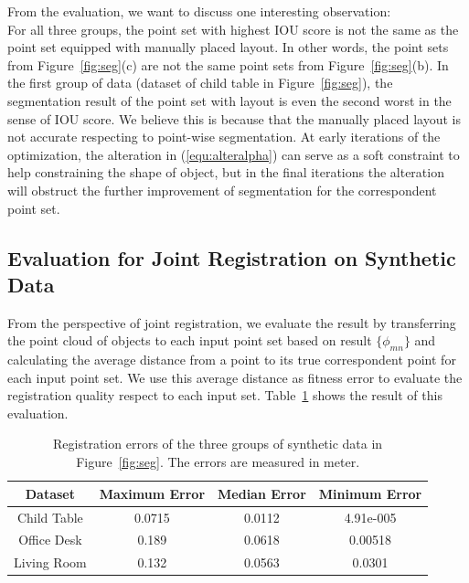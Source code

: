 From the evaluation, we want to discuss one interesting observation:\\
%
For all three groups, the point set with highest IOU score is not the same as the point set equipped with manually placed layout.
In other words, the point sets from Figure~\ref{fig:seg}(c) are not the same point sets from Figure~\ref{fig:seg}(b). 
In the first group of data (dataset of child table in Figure~\ref{fig:seg}), the segmentation result of the point set with layout is even the second worst in the sense of IOU score. We believe this is because that the manually placed layout is not accurate respecting to point-wise segmentation. 
At early iterations of the optimization, the alteration in (\ref{equ:alteralpha}) can serve as a soft constraint to help constraining the shape of object, but in the final iterations the alteration will obstruct the further improvement of segmentation for the correspondent point set. 



\subsection{Evaluation for Joint Registration on Synthetic Data}
%
From the perspective of joint registration, we evaluate the result by transferring the point cloud of objects to each input point set based on result $\{\phi_{mn}\}$ and calculating the average distance from a point to its true correspondent point for each input point set. 
%
We use this average distance as fitness error to evaluate the registration quality respect to each input set.
Table~\ref{tab:regerror} shows the result of this evaluation.

\begin{table}
	\centering
	\begin{tabular}{c c c c}
		Dataset & Maximum Error & Median Error & Minimum Error \\
		\hline
		Child Table & 0.0715 & 0.0112 & 4.91e-005 \\   
		Office Desk & 0.189  & 0.0618 & 0.00518 \\
		Living Room & 0.132  & 0.0563 & 0.0301\\
	\end{tabular}
	\caption{Registration errors of the three groups of synthetic data in Figure~\ref{fig:seg}. The errors are measured in meter. }
	\label{tab:regerror}
\end{table}



